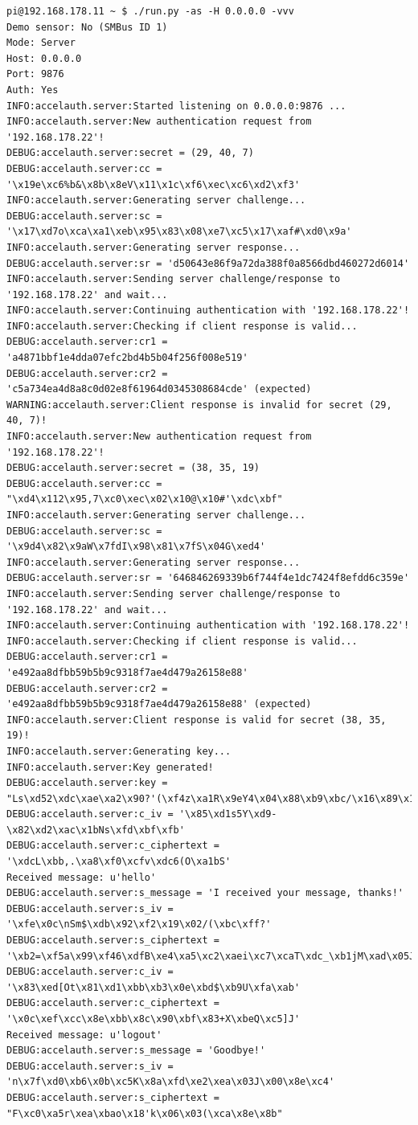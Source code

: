 \documentclass{article}
\begin{document}
\begin{lstlisting}
pi@192.168.178.11 ~ $ ./run.py -as -H 0.0.0.0 -vvv
Demo sensor: No (SMBus ID 1)
Mode: Server
Host: 0.0.0.0
Port: 9876
Auth: Yes
INFO:accelauth.server:Started listening on 0.0.0.0:9876 ...
INFO:accelauth.server:New authentication request from '192.168.178.22'!
DEBUG:accelauth.server:secret = (29, 40, 7)
DEBUG:accelauth.server:cc = '\x19e\xc6%b&\x8b\x8eV\x11\x1c\xf6\xec\xc6\xd2\xf3'
INFO:accelauth.server:Generating server challenge...
DEBUG:accelauth.server:sc = '\x17\xd7o\xca\xa1\xeb\x95\x83\x08\xe7\xc5\x17\xaf#\xd0\x9a'
INFO:accelauth.server:Generating server response...
DEBUG:accelauth.server:sr = 'd50643e86f9a72da388f0a8566dbd460272d6014'
INFO:accelauth.server:Sending server challenge/response to '192.168.178.22' and wait...
INFO:accelauth.server:Continuing authentication with '192.168.178.22'!
INFO:accelauth.server:Checking if client response is valid...
DEBUG:accelauth.server:cr1 = 'a4871bbf1e4dda07efc2bd4b5b04f256f008e519'
DEBUG:accelauth.server:cr2 = 'c5a734ea4d8a8c0d02e8f61964d0345308684cde' (expected)
WARNING:accelauth.server:Client response is invalid for secret (29, 40, 7)!
INFO:accelauth.server:New authentication request from '192.168.178.22'!
DEBUG:accelauth.server:secret = (38, 35, 19)
DEBUG:accelauth.server:cc = "\xd4\x112\x95,7\xc0\xec\x02\x10@\x10#'\xdc\xbf"
INFO:accelauth.server:Generating server challenge...
DEBUG:accelauth.server:sc = '\x9d4\x82\x9aW\x7fdI\x98\x81\x7fS\x04G\xed4'
INFO:accelauth.server:Generating server response...
DEBUG:accelauth.server:sr = '646846269339b6f744f4e1dc7424f8efdd6c359e'
INFO:accelauth.server:Sending server challenge/response to '192.168.178.22' and wait...
INFO:accelauth.server:Continuing authentication with '192.168.178.22'!
INFO:accelauth.server:Checking if client response is valid...
DEBUG:accelauth.server:cr1 = 'e492aa8dfbb59b5b9c9318f7ae4d479a26158e88'
DEBUG:accelauth.server:cr2 = 'e492aa8dfbb59b5b9c9318f7ae4d479a26158e88' (expected)
INFO:accelauth.server:Client response is valid for secret (38, 35, 19)!
INFO:accelauth.server:Generating key...
INFO:accelauth.server:Key generated!
DEBUG:accelauth.server:key = "Ls\xd52\xdc\xae\xa2\x90?'(\xf4z\xa1R\x9eY4\x04\x88\xb9\xbc/\x16\x89\x12\xfbH\x0f\x08\x9a\xed"
DEBUG:accelauth.server:c_iv = '\x85\xd1s5Y\xd9-\x82\xd2\xac\x1bNs\xfd\xbf\xfb'
DEBUG:accelauth.server:c_ciphertext = '\xdcL\xbb,.\xa8\xf0\xcfv\xdc6(O\xa1bS'
Received message: u'hello'
DEBUG:accelauth.server:s_message = 'I received your message, thanks!'
DEBUG:accelauth.server:s_iv = '\xfe\x0c\nSm$\xdb\x92\xf2\x19\x02/(\xbc\xff?'
DEBUG:accelauth.server:s_ciphertext = '\xb2=\xf5a\x99\xf46\xdfB\xe4\xa5\xc2\xaei\xc7\xcaT\xdc_\xb1jM\xad\x05J\xc4%m.\\\t\xf6P\x1b7\x1c\x97)iz\x15\n\xf0\xcf}\xf3ku'
DEBUG:accelauth.server:c_iv = '\x83\xed[Ot\x81\xd1\xbb\xb3\x0e\xbd$\xb9U\xfa\xab'
DEBUG:accelauth.server:c_ciphertext = '\x0c\xef\xcc\x8e\xbb\x8c\x90\xbf\x83+X\xbeQ\xc5]J'
Received message: u'logout'
DEBUG:accelauth.server:s_message = 'Goodbye!'
DEBUG:accelauth.server:s_iv = 'n\x7f\xd0\xb6\x0b\xc5K\x8a\xfd\xe2\xea\x03J\x00\x8e\xc4'
DEBUG:accelauth.server:s_ciphertext = "F\xc0\xa5r\xea\xbao\x18'k\x06\x03(\xca\x8e\x8b"
\end{lstlisting}
\end{document}
